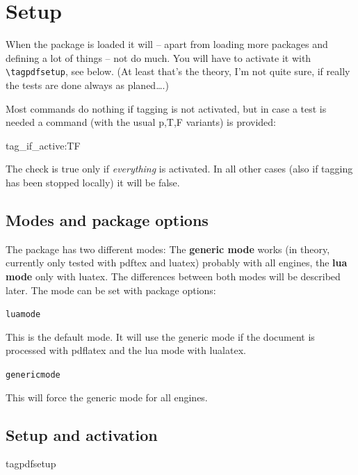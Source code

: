 \documentclass[DIV=12,parskip=half-,bibliography=totoc]{scrartcl}
\newcommand\DescribeKey[1]{\texttt{#1}}
\begin{document}
\section{Setup}




When the package is loaded it will -- apart from loading more packages and defining a lot of things -- not do much. You will have to activate it with \verb+\tagpdfsetup+, see below. (At least that's the theory, I'm not quite sure, if really the tests are done always as planed\ldots.)

Most commands do nothing if tagging is not activated, but in case a test is needed a command (with the usual p,T,F variants) is provided:

\begin{docCommand}{tag_if_active:TF}{}\end{docCommand}

The check is true only if \emph{everything} is activated. In all other cases (also if tagging has been stopped locally) it will be false.

\subsection{Modes and package options}




The package has two different modes: The \textbf{generic mode} works (in theory, currently only tested with pdftex and luatex) probably with all engines, the \textbf{lua mode} only with luatex. The differences between both modes  will be described later. The mode can be set with package options:

\DescribeKey{luamode}

This is the default mode. It will use the generic mode if the document is processed with pdflatex and the lua mode with lualatex.

\DescribeKey{genericmode}

This will force the generic mode for all engines.


\subsection{Setup and activation}\label{ssec:setup}


\begin{docCommand}{tagpdfsetup}{}\end{docCommand}
\end{document}
